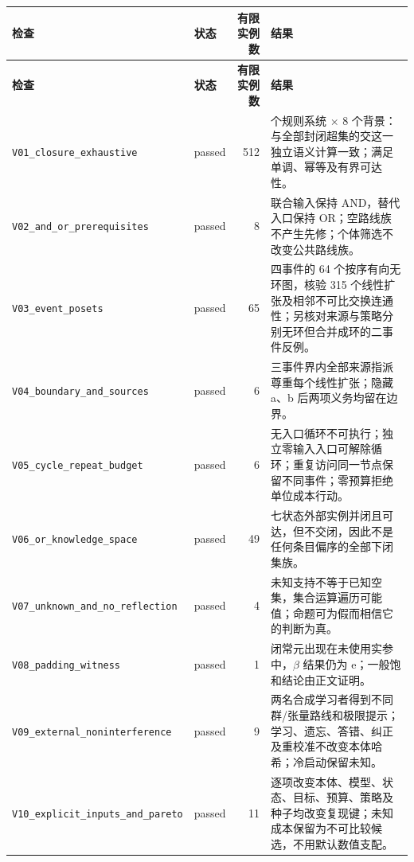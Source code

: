 \documentclass[UTF8,a4paper,zihao=-4,fontset=windows,openany]{ctexbook}
\newcommand{\mcsbrk}{\penalty 200\relax}
\begin{document}
\begingroup\small\setlength{\tabcolsep}{4pt}
\begin{longtable}{>{\raggedright\arraybackslash}p{}>{\raggedright\arraybackslash}p{}r>{\raggedright\arraybackslash}p{}}
\toprule
\textbf{检查} & \textbf{状态} & \textbf{有限实例数} & \textbf{结果} \\
\midrule
\endfirsthead
\toprule
\textbf{检查} & \textbf{状态} & \textbf{有限实例数} & \textbf{结果} \\
\midrule
\endhead
\bottomrule
\endfoot
\bottomrule
\endlastfoot
\texttt{V01\mcsbrk\_closure\mcsbrk\_exhaustive} & passed & 512 & 64 个规则系统 \(\times\) 8 个背景：与全部封闭超集的交这一独立语义计算一致；满足单调、幂等及有界可达性。 \\
\texttt{V02\mcsbrk\_and\mcsbrk\_or\mcsbrk\_prerequisites} & passed & 8 & 联合输入保持 AND，替代入口保持 OR；空路线族不产生先修；个体筛选不改变公共路线族。 \\
\texttt{V03\mcsbrk\_event\mcsbrk\_posets} & passed & 65 & 四事件的 64 个按序有向无环图，核验 315 个线性扩张及相邻不可比交换连通性；另核对来源与策略分别无环但合并成环的二事件反例。 \\
\texttt{V04\mcsbrk\_boundary\mcsbrk\_and\mcsbrk\_sources} & passed & 6 & 三事件界内全部来源指派尊重每个线性扩张；隐藏 a、b 后两项义务均留在边界。 \\
\texttt{V05\mcsbrk\_cycle\mcsbrk\_repeat\mcsbrk\_budget} & passed & 6 & 无入口循环不可执行；独立零输入入口可解除循环；重复访问同一节点保留不同事件；零预算拒绝单位成本行动。 \\
\texttt{V06\mcsbrk\_or\mcsbrk\_knowledge\mcsbrk\_space} & passed & 49 & 七状态外部实例并闭且可达，但不交闭，因此不是任何条目偏序的全部下闭集族。 \\
\texttt{V07\mcsbrk\_unknown\mcsbrk\_and\mcsbrk\_no\mcsbrk\_reflection} & passed & 4 & 未知支持不等于已知空集，集合运算遍历可能值；命题可为假而相信它的判断为真。 \\
\texttt{V08\mcsbrk\_padding\mcsbrk\_witness} & passed & 1 & 闭常元出现在未使用实参中，\(\beta\) 结果仍为 e；一般饱和结论由正文证明。 \\
\texttt{V09\mcsbrk\_external\mcsbrk\_noninterference} & passed & 9 & 两名合成学习者得到不同群/张量路线和极限提示；学习、遗忘、答错、纠正及重校准不改变本体哈希；冷启动保留未知。 \\
\texttt{V10\mcsbrk\_explicit\mcsbrk\_inputs\mcsbrk\_and\mcsbrk\_pareto} & passed & 11 & 逐项改变本体、模型、状态、目标、预算、策略及种子均改变复现键；未知成本保留为不可比较候选，不用默认数值支配。 \\

\end{longtable}
\end{document}

